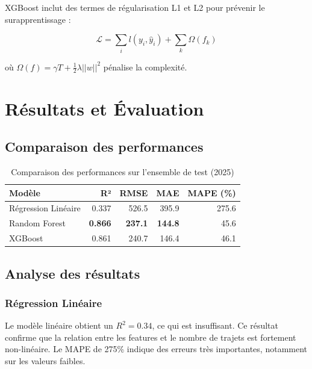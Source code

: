 \documentclass[12pt,a4paper]{article}
\begin{document}
XGBoost inclut des termes de régularisation L1 et L2 pour prévenir le surapprentissage :

\begin{equation}
\mathcal{L} = \sum_{i} l(y_i, \hat{y}_i) + \sum_{k} \Omega(f_k)
\end{equation}

où $\Omega(f) = \gamma T + \frac{1}{2}\lambda ||w||^2$ pénalise la complexité.

\section{Résultats et Évaluation}

\subsection{Comparaison des performances}

\begin{table}[H]
\centering
\caption{Comparaison des performances sur l'ensemble de test (2025)}
\label{tab:results}
\begin{tabular}{lrrrr}
\toprule
\textbf{Modèle} & \textbf{R²} & \textbf{RMSE} & \textbf{MAE} & \textbf{MAPE (\%)} \\
\midrule
Régression Linéaire & 0.337 & 526.5 & 395.9 & 275.6 \\
Random Forest & \textbf{0.866} & \textbf{237.1} & \textbf{144.8} & 45.6 \\
XGBoost & 0.861 & 240.7 & 146.4 & 46.1 \\
\bottomrule
\end{tabular}
\end{table}

\subsection{Analyse des résultats}

\subsubsection{Régression Linéaire}

Le modèle linéaire obtient un $R^2 = 0.34$, ce qui est insuffisant. Ce résultat confirme que la relation entre les features et le nombre de trajets est fortement non-linéaire. Le MAPE de 275\% indique des erreurs très importantes, notamment sur les valeurs faibles.
\end{document}
